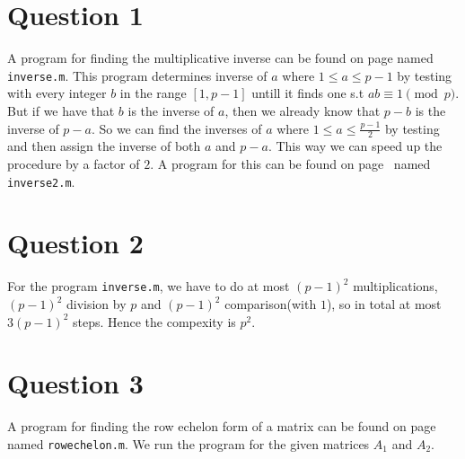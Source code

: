 \documentclass[11pt]{article}
\begin{document}
\renewcommand{\labelenumi}{\roman{enumi}}




\section*{Question 1}

A program for finding the multiplicative inverse can be found on page \pageref{sec:program1} named \texttt{inverse.m}. This program determines inverse of $a$ where $1\leq a \leq p-1$ by testing with every integer $b$ in the range $[1,p-1]$ untill it finds one s.t $ab \equiv 1 \pmod p$.\\

But if we have that $b$ is the inverse of $a$, then we already know that $p-b$ is the inverse of $p-a$. So we can find the inverses of $a$ where $1\leq a \leq \frac{p-1}2$ by testing and then assign the inverse of both $a$ and $p-a$. This way we can speed up the procedure by a factor of $2$. A program for this can be found on page~\pageref{sec:program1} named \texttt{inverse2.m}.







\section*{Question 2}
For the program \texttt{inverse.m}, we have to do at most $(p-1)^2$ multiplications, $(p-1)^2$ division by $p$ and $(p-1)^2$ comparison(with $1$), so in total at most $3(p-1)^2$ steps. Hence the compexity is $p^2$.








\section*{Question 3}  A program for finding the row echelon form of a matrix can be found on page~\pageref{sec:prgram2} named \texttt{rowechelon.m}. We run the program for the given matrices $A_1$ and $A_2$.
\end{document}

